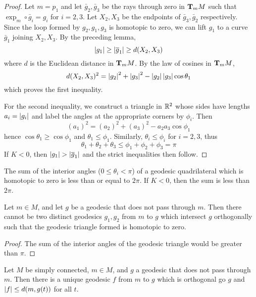 \documentclass[../main]{subfiles}
\begin{document}
\begin{proof}
Let $m=p_1$ and let $\bar g_2,\bar g_3$ be the rays through zero in $\ts Mm$ such that $\exp_m\circ\bar g_i=g_i$ for $i=2,3$. Let $X_2,X_3$ be the endpoints of $\bar g_3,\bar g_2$ respectively. Since the loop formed by $g_2,g_1,g_3$ is homotopic to zero, we can lift $g_1$ to a curve $\bar g_1$ joining $X_2,X_3$. By the preceding lemma,
\[\norm{g_1} \ge \norm{\bar g_1} \ge d(X_2,X_3)\]
where $d$ is the Euclidean distance in $\ts Mm$. By the law of cosines in $\ts Mm$,
\[d(X_2,X_3)^2 = \norm{g_2}^2 + \norm{g_3}^2 - \norm{g_2}\norm{g_3}\cos\theta_1\]
which proves the first inequality.

For the second inequality, we construct a triangle in $\bR^2$ whose sides have lengths $a_i=\norm{g_i}$ and label the angles at the appropriate corners by $\phi_i$. Then
\[(a_1)^2 = (a_2)^2 + (a_3)^2 - a_2a_3\cos\phi_1\]
hence $\cos\theta_1\ge\cos\phi_1$ and $\theta_1\le\phi_1$. Similarly, $\theta_i\le\phi_i$ for $i=2,3$, thus
\[\theta_1+\theta_2+\theta_3 \le \phi_1+\phi_2+\phi_3 = \pi\]
If $K<0$, then $\norm{g_1}>\norm{\bar g_1}$ and the strict inequalities then follow.
\end{proof}



\begin{corollary} \label{cor:ch10.8.3}
The sum of the interior angles ($0\le\theta_i<\pi$) of a geodesic quadrilateral which is homotopic to zero is less than or equal to $2\pi$. If $K<0$, then the sum is less than $2\pi$.
\end{corollary}



\begin{corollary} \label{cor:ch10.8.4}
Let $m\in M$, and let $g$ be a geodesic that does not pass through $m$. Then there cannot be two distinct geodesics $g_1,g_2$ from $m$ to $g$ which intersect $g$ orthogonally such that the geodesic triangle formed is homotopic to zero.
\end{corollary}

\begin{proof}
The sum of the interior angles of the geodesic triangle would be greater than $\pi$.
\end{proof}



\begin{corollary}\label{cor:ch10.8.5}
Let $M$ be simply connected, $m\in M$, and $g$ a geodesic that does not pass through $m$. Then there is a unique geodesic $f$ from $m$ to $g$ which is orthogonal go $g$ and $\norm f\le d(m,g(t))$ for all $t$.
\end{corollary}
\end{document}
